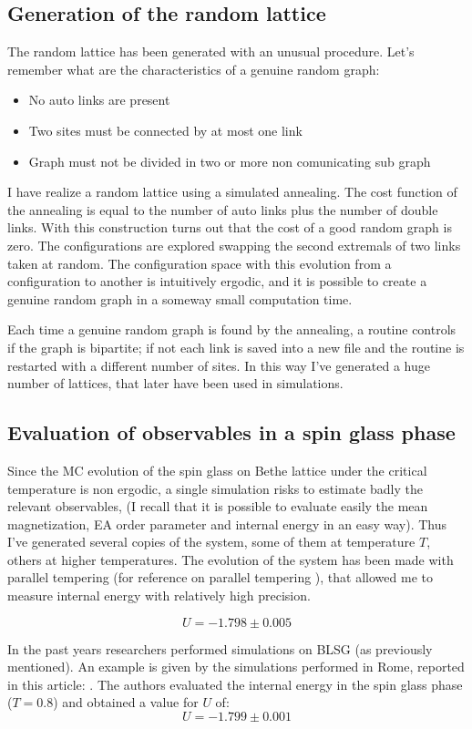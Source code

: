 \subsection{Generation of the random lattice}

The random lattice has been generated with an unusual procedure.
Let's remember what are the characteristics of a genuine random graph:
\begin{itemize}

\item{No auto links are present}
\item{Two sites must be connected by at most one link}
\item{Graph must not be divided in two or more non comunicating sub graph}

\end{itemize}

I have realize a random lattice using a simulated annealing. The cost function of the annealing is equal to the number of auto links plus the number of double links.
With this construction turns out that the cost of a good random graph is zero. The configurations are explored swapping the second extremals of two links taken at random. The configuration space with this evolution from a configuration to another is intuitively ergodic, and it is possible to create a genuine random graph in a someway small computation time.

Each time a genuine random graph is found by the annealing, a routine controls if the graph is bipartite; if not each link is saved into a new file and the routine is restarted with a different number of sites.
In this way I've generated a huge number of lattices, that later have been used in simulations.

\subsection{Evaluation of observables in a spin glass phase}

Since the MC evolution of the spin glass on Bethe lattice under the critical temperature is non ergodic, a single simulation risks to estimate badly the relevant observables, (I recall that it is possible to evaluate easily the mean magnetization, EA order parameter and internal energy in an easy way). Thus I've generated several copies of the system, some of them at temperature $T$, others at higher temperatures. The evolution of the system has been made with parallel tempering (for reference on parallel tempering \cite{tempering}), that allowed me to measure internal energy with relatively high precision.

\begin{equation}
U = -1.798 \pm 0.005
\end{equation}

In the past years researchers performed simulations on BLSG (as previously mentioned). An example is given by the simulations performed in Rome, reported in this article: \cite{zullo}. The authors evaluated the internal energy in the spin glass phase ($T = 0.8$) and obtained a value for $U$ of:
\begin{equation}
U = -1.799 \pm 0.001
\end{equation}
